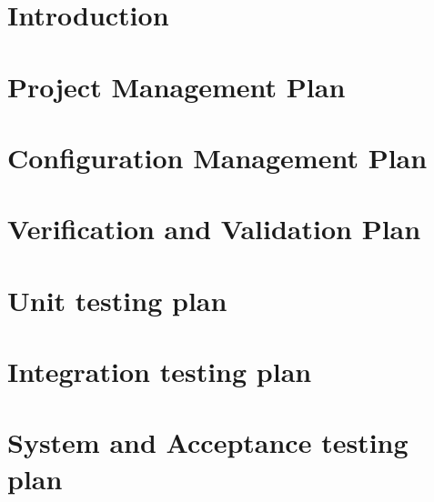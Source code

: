 \documentclass[a4paper,twoside,openright,makeidx,12pt]{book}
\begin{document}
\pagestyle{empty}
\renewcommand{\arraystretch}{1.8}



\tableofcontents


\pagestyle{fancy}
\cleardoublepage

\chapter{Introduction}
\label{Sec:QP-Intoduction}


\newpage
\chapter{Project Management Plan}
\label{Sec:QP-PMP}


\newpage
\chapter{Configuration Management Plan}
\label{Sec:QP-CMP}



\newpage
\chapter{Verification and Validation Plan}
\label{Sec:QP-VVP}


\chapter{Unit testing plan}
\label{Sec:QP-PRUT}


\chapter{Integration testing plan}
\label{Sec:QP-PRIT}


%

\chapter{System and Acceptance testing plan}
\label{Sec:QP-PRAT}

\end{document}
